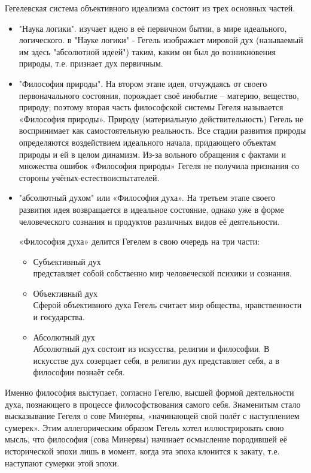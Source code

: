 \documentclass[12pt]{article}
\begin{document}
Гегелевская система объективного идеализма состоит из трех основных частей.
\begin{itemize}
\item "Наука логики". \newline
	изучает идею в её первичном бытии, в мире идеального, логического.
	в "Науке логики" - Гегель изображает мировой дух (называемый им здесь "абсолютной идеей") таким,
	каким он был до возникновения природы, т.е. признает дух первичным.
\item "Философия природы". \newline
	На втором этапе идея, отчуждаясь от своего первоначального состояния, порождает своё инобытие – материю,
	вещество, природу; поэтому вторая часть философской системы Гегеля называется «Философия природы».
	Природу (материальную действительность) Гегель не воспринимает как самостоятельную реальность.
	Все стадии развития природы определяются воздействием идеального начала, придающего объектам природы и
	ей в целом динамизм.
	Из-за вольного обращения с фактами и множества ошибок «Философия природы» Гегеля
	не получила признания со стороны учёных-естествоиспытателей.
\item "абсолютный духом" или «Философия духа». \newline
	На третьем этапе своего развития идея возвращается в идеальное состояние,
	однако уже в форме человеческого сознания и продуктов различных видов её деятельности.

	«Философия духа» делится Гегелем в свою очередь на три части:
	\begin{itemize}
	\item Субъективный дух \\
		представляет собой собственно мир человеческой психики и сознания.
	\item Объективный дух \\
		Сферой объективного духа Гегель считает мир общества, нравственности и государства.
	\item Абсолютный дух \\
		Абсолютный дух состоит из искусства, религии и философии.
		В искусстве дух созерцает себя, в религии дух представляет себя, а в философии познаёт себя.
	\end{itemize}
\end{itemize}
Именно философия выступает, согласно Гегелю, высшей формой деятельности духа,
познающего в процессе философствования самого себя. Знаменитым стало высказывание Гегеля о сове Минервы,
«начинающей свой полёт с наступлением сумерек».
Этим аллегорическим образом Гегель хотел иллюстрировать свою мысль,
что философия (сова Минервы) начинает осмысление породившей её исторической эпохи лишь в момент,
когда эта эпоха клонится к закату, т.е. наступают сумерки этой эпохи.
\end{document}
